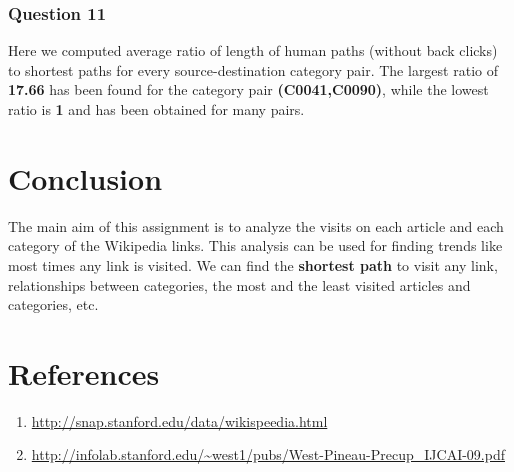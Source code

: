 \documentclass[12pt,a4paper]{report}
\begin{document}
\begin{flushleft}
\subsection*{Question 11}
Here we computed average ratio of length of human paths (without back clicks) to shortest paths for every source-destination category pair. The largest ratio of \textbf{17.66} has been found for the category pair \textbf{(C0041,C0090)}, while the lowest ratio is \textbf{1} and has been obtained for many pairs.

\end{flushleft}

\newpage

\chapter{Conclusion}

\begin{flushleft}
The main aim of this assignment is to analyze the visits on each article and each
category of the Wikipedia links. This analysis can be used for finding trends like most times any link is visited. We can find the \textbf{shortest path} to visit any link, relationships between categories, the most and the least visited articles and
categories, etc.

\end{flushleft}

\chapter{References}



\begin{enumerate}
    \item \url{http://snap.stanford.edu/data/wikispeedia.html}
    
    \item \url{http://infolab.stanford.edu/~west1/pubs/West-Pineau-Precup\_IJCAI-09.pdf}
\end{enumerate}
\end{document}
